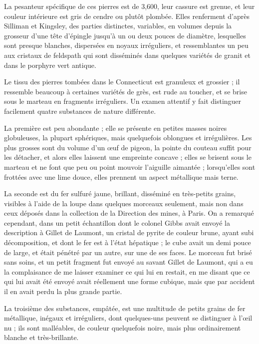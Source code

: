 \documentclass[a4paper, 12pt, oneside, french]{article}
\begin{document}
La pesanteur spécifique de ces pierres est de 3,600, leur cassure est grenue, et leur couleur intérieure est gris de cendre ou plutôt plombée. Elles renferment d'après Silliman et Kingsley, des parties distinctes, variables, en volumes depuis la grosseur d'une tête d'épingle jusqu'à un ou deux pouces de diamètre, lesquelles sont presque blanches, dispersées en noyaux irréguliers, et ressemblantes un peu aux cristaux de feldspath qui sont disséminés dans quelques variétés de granit et dans le porphyre vert antique.

Le tissu des pierres tombées dans le Connecticut est granuleux et grossier ; il ressemble beaucoup à certaines variétés de grès, est rude au toucher, et se brise sous le marteau en fragments irréguliers. Un examen attentif y fait distinguer facilement quatre substances de nature différente.

La première est peu abondante ; elle se présente en petites masses noires globuleuses, la plupart sphériques, mais quelquefois oblongues et irrégulières. Les plus grosses sont du volume d'un œuf de pigeon, la pointe du couteau suffit pour les détacher, et alors elles laissent une empreinte concave ; elles se brisent sous le marteau et ne font que peu ou point mouvoir l'aiguille aimantée ; lorsqu'elles sont frottées avec une lime douce, elles prennent un aspect métallique mais terne.

La seconde est du fer sulfuré jaune, brillant, disséminé en très-petits grains, visibles à l'aide de la loupe dans quelques morceaux seulement, mais non dans ceux déposés dans la collection de la Direction des mines, à Paris. On a remarqué cependant, dans un petit échantillon dont le colonel Gibbs avait envoyé la description à Gillet de Laumont, un cristal de pyrite de couleur brune, ayant subi décomposition, et dont le fer est à l'état hépatique ; le cube avait un demi pouce de large, et était pénétré par un autre, sur une de ses faces. Le morceau fut brisé sans soins, et un petit fragment fut envoyé au savant Gillet de Laumont, qui a eu la complaisance de me laisser examiner ce qui lui en restait, en me disant que ce qui lui avait été envoyé avait réellement une forme cubique, mais que par accident il en avait perdu la plus grande partie.

La troisième des substances, empâtée, est une multitude de petits grains de fer métallique, inégaux et irréguliers, dont quelques-uns peuvent se distinguer à l'œil nu ; ils sont malléables, de couleur quelquefois noire, mais plus ordinairement blanche et très-brillante.
\end{document}
